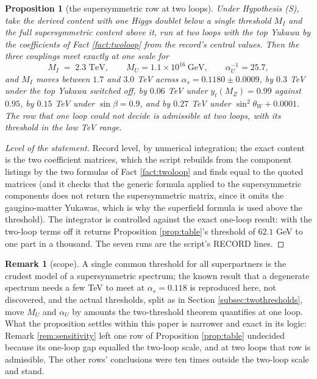 \documentclass[11pt]{article}
\newtheorem{proposition}[theorem]{Proposition}
\theoremstyle{definition}
\newtheorem{remark}[theorem]{Remark}
\begin{document}
\begin{proposition}[the supersymmetric row at two loops]\label{prop:twoloop}
Under Hypothesis (S), take the derived content with one Higgs doublet below a single threshold $M_{I}$ and the full supersymmetric content above it, run at two loops with the top Yukawa by the coefficients of Fact \ref{fact:twoloop} from the record's central values. Then the three couplings meet exactly at one scale for
\[
M_{I} \;=\; 2.3 \text{ TeV}, \qquad M_{U} = 1.1 \times 10^{16}\ \text{GeV}, \qquad \alpha_{U}^{-1} = 25.7,
\]
and $M_{I}$ moves between $1.7$ and $3.0$ TeV across $\alpha_{s} = 0.1180 \pm 0.0009$, by $0.3$ TeV under the top Yukawa switched off, by $0.06$ TeV under $y_{t}(M_{Z}) = 0.99$ against $0.95$, by $0.15$ TeV under $\sin\beta = 0.9$, and by $0.27$ TeV under $\sin^{2}\theta_{W} + 0.0001$. The row that one loop could not decide is admissible at two loops, with its threshold in the low TeV range.
\end{proposition}

\begin{proof}[Level of the statement]
Record level, by numerical integration; the exact content is the two coefficient matrices, which the script rebuilds from the component listings by the two formulas of Fact \ref{fact:twoloop} and finds equal to the quoted matrices (and it checks that the generic formula applied to the supersymmetric components does not return the supersymmetric matrix, since it omits the gaugino-matter Yukawas, which is why the superfield formula is used above the threshold). The integrator is controlled against the exact one-loop result: with the two-loop terms off it returns Proposition \ref{prop:table}'s threshold of $62.1$ GeV to one part in a thousand. The seven runs are the script's RECORD lines.
\end{proof}

\begin{remark}[scope]\label{rem:twoloopscope}
A single common threshold for all superpartners is the crudest model of a supersymmetric spectrum; the known result that a degenerate spectrum needs a few TeV to meet at $\alpha_{s} = 0.118$ is reproduced here, not discovered, and the actual thresholds, split as in Section \ref{subsec:twothresholds}, move $M_{U}$ and $\alpha_{U}$ by amounts the two-threshold theorem quantifies at one loop. What the proposition settles within this paper is narrower and exact in its logic: Remark \ref{rem:sensitivity} left one row of Proposition \ref{prop:table} undecided because its one-loop gap equalled the two-loop scale, and at two loops that row is admissible. The other rows' conclusions were ten times outside the two-loop scale and stand.
\end{remark}
\end{document}
